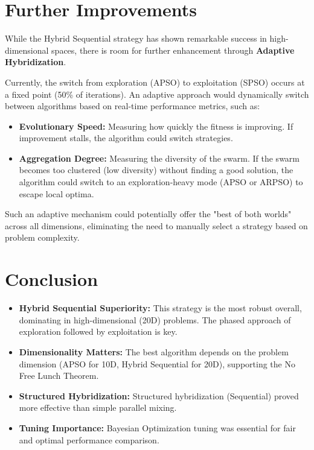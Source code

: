 \documentclass[a4paper,12pt]{article}
\begin{document}
\section{Further Improvements}
While the Hybrid Sequential strategy has shown remarkable success in high-dimensional spaces, there is room for further enhancement through \textbf{Adaptive Hybridization}.

Currently, the switch from exploration (APSO) to exploitation (SPSO) occurs at a fixed point (50\% of iterations). An adaptive approach would dynamically switch between algorithms based on real-time performance metrics, such as:
\begin{itemize}
    \item \textbf{Evolutionary Speed:} Measuring how quickly the fitness is improving. If improvement stalls, the algorithm could switch strategies.
    \item \textbf{Aggregation Degree:} Measuring the diversity of the swarm. If the swarm becomes too clustered (low diversity) without finding a good solution, the algorithm could switch to an exploration-heavy mode (APSO or ARPSO) to escape local optima.
\end{itemize}
Such an adaptive mechanism could potentially offer the "best of both worlds" across all dimensions, eliminating the need to manually select a strategy based on problem complexity.

\section{Conclusion}
\begin{itemize}
    \item \textbf{Hybrid Sequential Superiority:} This strategy is the most robust overall, dominating in high-dimensional (20D) problems. The phased approach of exploration followed by exploitation is key.
    \item \textbf{Dimensionality Matters:} The best algorithm depends on the problem dimension (APSO for 10D, Hybrid Sequential for 20D), supporting the No Free Lunch Theorem.
    \item \textbf{Structured Hybridization:} Structured hybridization (Sequential) proved more effective than simple parallel mixing.
    \item \textbf{Tuning Importance:} Bayesian Optimization tuning was essential for fair and optimal performance comparison.
\end{itemize}



\end{document}
